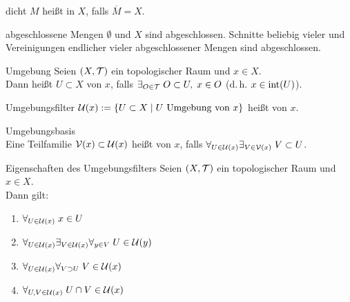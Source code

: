 \begin{Def}{dicht}
    $M$ heißt  in $X$, falls $\overline{M} = X$.
\end{Def}

\begin{Satz}{abgeschlossene Mengen}
    $\emptyset$ und $X$ sind abgeschlossen.
    Schnitte beliebig vieler und Vereinigungen endlicher vieler abgeschlossener Mengen sind
    abgeschlossen.
\end{Satz}

\linie

\begin{Def}{Umgebung}
    Seien $(X, \mathcal{T})$ ein topologischer Raum und $x \in X$.\\
    Dann heißt $U \subset X$  von $x$, falls
    $\exists_{O \in \mathcal{T}}\; O \subset U,\; x \in O$
    (d.\,h. $x \in \operatorname{int}(U)$).
\end{Def}

\begin{Def}{Umgebungsfilter}
    $\mathcal{U}(x) := \{U \subset X \;|\; U \text{ Umgebung von } x\}$ heißt
     von $x$.
\end{Def}

\begin{Def}{Umgebungsbasis}\\
    Eine Teilfamilie $\mathcal{V}(x) \subset \mathcal{U}(x)$ heißt  von $x$, falls
    $\forall_{U \in \mathcal{U}(x)} \exists_{V \in \mathcal{V}(x)}\; V \subset U$.
\end{Def}

\begin{Satz}{Eigenschaften des Umgebungsfilters}
    Seien $(X, \mathcal{T})$ ein topologischer Raum und $x \in X$.\\
    Dann gilt:
    \begin{enumerate}
        \item
        $\forall_{U \in \mathcal{U}(x)}\; x \in U$
        
        \item
        $\forall_{U \in \mathcal{U}(x)} \exists_{V \in \mathcal{U}(x)} \forall_{y \in V}\; U \in \mathcal{U}(y)$
        
        \item
        $\forall_{U \in \mathcal{U}(x)} \forall_{V \supset U}\; V \in \mathcal{U}(x)$
        
        \item
        $\forall_{U, V \in \mathcal{U}(x)}\; U \cap V \in \mathcal{U}(x)$
    \end{enumerate}
\end{Satz}

